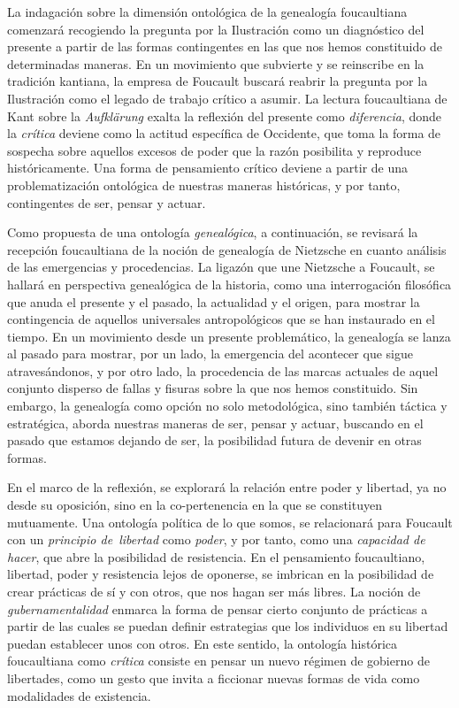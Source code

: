 La indagación sobre la dimensión ontológica de la genealogía foucaultiana comenzará recogiendo la pregunta por la Ilustración como un diagnóstico del presente a partir de las formas contingentes en las que nos hemos constituido de determinadas maneras. En un movimiento que subvierte y se reinscribe en la tradición kantiana, la empresa de Foucault buscará reabrir la pregunta por la Ilustración como el legado de trabajo crítico a asumir. La lectura foucaultiana de Kant sobre la \emph{Aufklärung} exalta la reflexión del presente como \emph{diferencia}, donde la \emph{crítica} deviene como la actitud específica de Occidente, que toma la forma de sospecha sobre aquellos excesos de poder que la razón posibilita y reproduce históricamente. Una forma de pensamiento crítico deviene a partir de una problematización ontológica de nuestras maneras históricas, y por tanto, contingentes de ser, pensar y actuar.

Como propuesta de una ontología \emph{genealógica}, a continuación, se revisará la recepción foucaultiana de la noción de genealogía de Nietzsche en cuanto análisis de las emergencias y procedencias. La ligazón que une Nietzsche a Foucault, se hallará en perspectiva genealógica de la historia, como una interrogación filosófica que anuda el presente y el pasado, la actualidad y el origen, para mostrar la contingencia de aquellos universales antropológicos que se han instaurado en el tiempo. En un movimiento desde un presente problemático, la genealogía se lanza al pasado para mostrar, por un lado, la emergencia del acontecer que sigue atravesándonos, y por otro lado, la procedencia de las marcas actuales de aquel conjunto disperso de fallas y fisuras sobre la que nos hemos constituido. Sin embargo, la genealogía como opción no solo metodológica, sino también táctica y estratégica, aborda nuestras maneras de ser, pensar y actuar, buscando en el pasado que estamos dejando de ser, la posibilidad futura de devenir en otras formas.

En el marco de la reflexión, se explorará la relación entre poder y libertad, ya no desde su oposición, sino en la co-pertenencia en la que se constituyen mutuamente. Una ontología política de lo que somos, se relacionará para Foucault con un \emph{principio de~libertad} como \emph{poder}, y por tanto, como una \emph{capacidad de hacer}, que abre la posibilidad de resistencia. En el pensamiento foucaultiano, libertad, poder y resistencia lejos de oponerse, se imbrican en la posibilidad de crear prácticas de sí y con otros, que nos hagan ser más libres. La noción de \emph{gubernamentalidad} enmarca la forma de pensar cierto conjunto de prácticas a partir de las cuales se puedan definir estrategias que los individuos en su libertad puedan establecer unos con otros. En este sentido, la ontología histórica foucaultiana como \emph{crítica} consiste en pensar un nuevo régimen de gobierno de libertades, como un gesto que invita a ficcionar nuevas formas de vida como modalidades de existencia.

